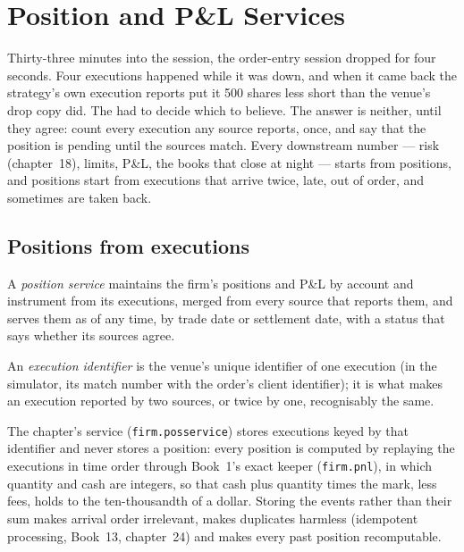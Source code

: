 \chapter{Position and P\&L Services}\label{ch:pl:position-and-pnl-services}

Thirty-three minutes into the session, the order-entry session dropped for four seconds. Four executions happened while it was down, and
when it came back the strategy's own execution reports put it 500 shares less short than the venue's drop copy did. The  had
to decide which to believe. The answer is neither, until they agree: count every execution any source reports, once, and say that the
position is pending until the sources match. Every downstream number --- risk (chapter~18), limits, P\&L, the books that close at night ---
starts from positions, and positions start from executions that arrive twice, late, out of order, and sometimes are taken back.

\section{Positions from executions}

\begin{definition}\label{def:pl:position-and-pnl-services:service}
A \emph{position service} maintains the firm's positions and P\&L by account and instrument from its executions,
merged from every source that reports them, and serves them as of any time, by trade date or settlement date, with a status that says
whether its sources agree.
\end{definition}

\begin{definition}\label{def:pl:position-and-pnl-services:execid}
An \emph{execution identifier} is the venue's unique identifier of one execution (in the simulator, its match
number with the order's client identifier); it is what makes an execution reported by two sources, or twice by one, recognisably the same.
\end{definition}

The chapter's service (\texttt{firm.posservice}) stores executions keyed by that identifier and never stores a position: every position is
computed by replaying the executions in time order through Book~1's exact keeper (\texttt{firm.pnl}), in which quantity and cash are
integers, so that cash plus quantity times the mark, less fees, holds to the ten-thousandth of a dollar. Storing the events rather than their
sum makes arrival order irrelevant, makes duplicates harmless (idempotent processing, Book~13, chapter~24) and makes every past position
recomputable.

